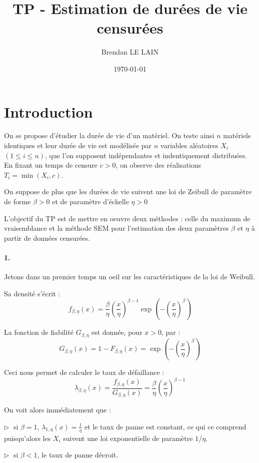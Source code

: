 \documentclass[a4paper]{report}
\title {TP - Estimation de durées de vie censurées}
\author {Brendan LE LAIN}
\date{\today}
\begin{document}
 
\pagestyle{headings}
 
\maketitle
 
\chapter {Introduction}

On se propose d'étudier la durée de vie d'un matériel. On teste ainsi $n$ matériels identiques et leur durée de vie est modélisée par $n$ variables aléatoires $X_i$ $(1 \le i \le n)$, que l'on supposent indépendantes et indentiquement distribuées. En fixant un temps de censure $c > 0$, on observe des réalisations $T_i = \min (X_i,c)$.

On suppose de plus que les durées de vie suivent une loi de Zeibull de paramètre de forme $\beta >0$ et de paramètre d'échelle $\eta >0$

L'objectif du TP est de mettre en oeuvre deux méthodes : celle du maximum de vraisemblance et la méthode SEM pour l'estimation des deux paramètres $\beta$ et $\eta$ à partir de données censurées.

\subsubsection{1.}

Jetons dans un premier temps un oeil sur les caractéristiques de la loi de Weibull.

Sa densité s'écrit : 
\[f_{\beta,\eta}(x)=\frac{\beta}{\eta} \left(\frac{x}{\eta}\right)^{\beta-1} \exp\left(-\left(\frac{x}{\eta}\right)^{\beta}\right)\]

La fonction de fiabilité $G_{\beta,\eta}$ est donnée, pour $x>0$, par :
\[G_{\beta,\eta}(x)=1-F_{\beta,\eta}(x)=\exp\left(-\left(\frac{x}{\eta}\right)^{\beta}\right)\]

 Ceci nous permet de calculer le taux de défaillance : 
 \[\lambda_{\beta,\eta}(x)=\frac{f_{\beta,\eta}(x)}{G_{\beta,\eta}(x)}=\frac{\beta}{\eta} \left(\frac{x}{\eta}\right)^{\beta-1}\]
 
 On voit alors immédiatement que :
 
 $\triangleright \; $ si $\beta=1$, $\lambda_{1,\eta}(x)=\frac{1}{\eta}$ et le taux de panne est constant, ce qui ce comprend puisqu'alors les $X_i$ suivent une loi exponentielle de paramètre $1/\eta$.
 
 $\triangleright \; $ si $\beta<1$, le taux de panne décroit.
 
\end{document}
